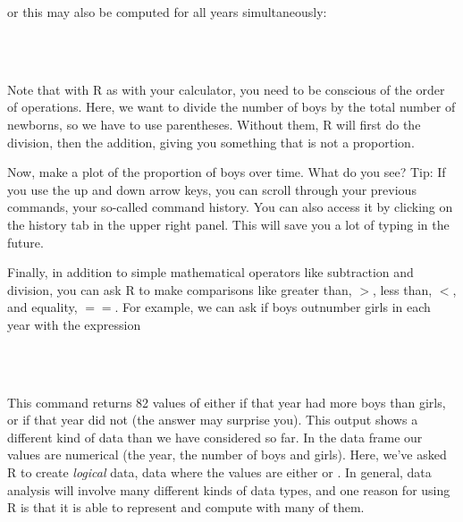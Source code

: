 \documentclass[11pt]{article}
\begin{document}
or this may also be computed for all years simultaneously:

\ttfamily
\hlstd{}\hspace*{\fill}\\
\hlstd{}\hlkeyword{\usebox{\hlnormalsizeboxdollar}}\hlkeyword{/}{\ }\hlkeyword{(}\hlkeyword{\usebox{\hlnormalsizeboxdollar}}\hlkeyword{+}{\ }\hlkeyword{\usebox{\hlnormalsizeboxdollar}}\hlkeyword{)}\hspace*{\fill}\\
\normalfont

Note that with R as with your calculator, you need to be conscious of the order of operations.  Here, we want to divide the number of boys by the total number of newborns, so we have to use parentheses.  Without them, R will first do the division, then the addition, giving you something that is not a proportion.

\begin{exercise}
Now, make a plot of the proportion of boys over time. What do you see? Tip: If you use the up and down arrow keys, you can scroll through your previous commands, your so-called command history. You can also access it by clicking on the history tab in the upper right panel.  This will save you a lot of typing in the future.
\end{exercise}

Finally, in addition to simple mathematical operators like subtraction and division, you can ask R to make comparisons like greater than, $>$, less than, $<$, and equality, $==$. For example, we can ask if boys outnumber girls in each year with the expression

\ttfamily
\hlstd{}\hspace*{\fill}\\
\hlstd{}\hlkeyword{\usebox{\hlnormalsizeboxdollar}}\hlkeyword{\usebox{\hlnormalsizeboxgreaterthan}}{\ }\hlkeyword{\usebox{\hlnormalsizeboxdollar}}\hspace*{\fill}\\
\normalfont

This command returns 82 values of either \texttt{}  if that year had more boys than girls, or \texttt{} if that year did not (the answer may surprise you). This output shows a different kind of data than we have considered so far. In the \texttt{} data frame our values are numerical (the year, the number of boys and girls). Here, we've asked R to create \emph{logical} data, data where the values are either \texttt{} or \texttt{}. In general, data analysis will involve many different kinds of data types, and one reason for using R is that it is able to represent and compute with many of them.
\end{document}
